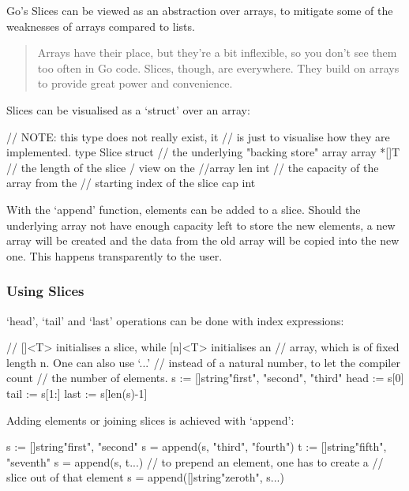 Go's Slices can be viewed as an abstraction over arrays, to mitigate some of the weaknesses of arrays
compared to lists.

\begin{quote}
    Arrays have their place, but they're a bit inflexible, so you don't see them too often in Go code.
    Slices, though, are everywhere. They build on arrays to provide great power and convenience.\autocite{golang-slices}
\end{quote}

Slices can be visualised as a `struct' over an array:

\begin{gocode}
// NOTE: this type does not really exist, it
// is just to visualise how they are implemented.
type Slice struct {
    // the underlying "backing store" array
    array *[]T
    // the length of the slice / view on the
    //array
    len   int
    // the capacity of the array from the
    // starting index of the slice
    cap   int
}
\end{gocode}

With the `append' function, elements can be added to a slice. Should the underlying array not have enough
capacity left to store the new elements, a new array will be created and the data from the old array will
be copied into the new one. This happens transparently to the user.

\subsubsection{Using Slices}

`head', `tail' and `last' operations can be done with index expressions:

\begin{gocode}
// []<T> initialises a slice, while [n]<T> initialises an
// array, which is of fixed length n. One can also use `...'
// instead of a natural number, to let the compiler count
// the number of elements.
s := []string{"first", "second", "third"}
head := s[0]
tail := s[1:]
last := s[len(s)-1]
\end{gocode}

Adding elements or joining slices is achieved with `append':

\begin{gocode}
s := []string{"first", "second"}
s = append(s, "third", "fourth")
t := []string{"fifth", "seventh"}
s = append(s, t...)
// to prepend an element, one has to create a
// slice out of that element
s = append([]string{"zeroth"}, s...)
\end{gocode}

